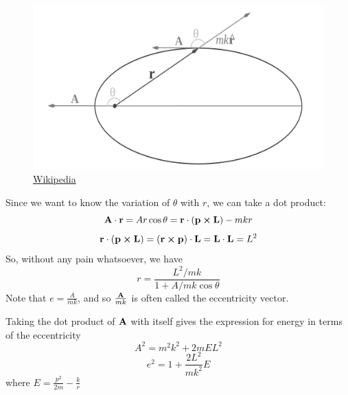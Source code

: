 \begin{frame}
	\begin{figure}
		\includegraphics[width=\linewidth]{./images/LRL.png}
		\caption{\href{https://en.wikipedia.org/wiki/Laplace-Runge-Lenz\_vector}{Wikipedia}}
	\end{figure}
\end{frame}
\begin{frame}
	Since we want to know the variation of $\theta$ with $r$, we can take a dot product:
	\begin{equation*}
		\vb{A}\cdot\vb{r} = Ar \cos \theta = \vb{r}\cdot(\vb{p}\cross\vb{L}) - mkr
	\end{equation*}
	\begin{equation*}
		\vb{r}\cdot(\vb{p}\cross\vb{L})	= (\vb{r} \cross \vb{p})\cdot\vb{L} = \vb{L}\cdot\vb{L} = L^2
	\end{equation*}
	So, without any pain whatsoever, we have 
	\begin{equation*}
		r = \frac{L^2/mk}{1 + A/mk\cos\theta}
	\end{equation*}
	Note that $e = \frac{A}{mk}$, and so $\frac{\vb{A}}{mk}$ is often called the eccentricity vector.
\end{frame}

\begin{frame}
	Taking the dot product of $\vb{A}$ with itself gives the expression for energy in terms of the eccentricity
	\begin{equation*}
		A^2 = m^2k^2 + 2mEL^2
	\end{equation*}
	\begin{equation*}
		e^2 = 1 + \frac{2L^2}{mk^2}E
	\end{equation*}
	where $E = \frac{p^2}{2m} - \frac{k}{r}$
\end{frame}

